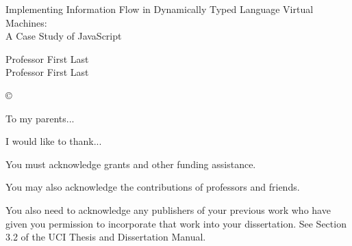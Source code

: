 \documentclass[12pt,fleqn]{ucithesis}
\begin{document}
\thesistitle
{
	Implementing Information Flow in Dynamically Typed Language Virtual Machines:\\
	A Case Study of JavaScript
}




\othercommitteemembers
{
	Professor First Last\\
	Professor First Last
}


\copyrightdeclaration
{
	{\copyright} {\Degreeyear} \Authorname
}


\dedications
{
	To my parents...
}

\acknowledgments
{
	I would like to thank...

	You must acknowledge grants and other funding assistance. 

	You may also acknowledge the contributions of professors and friends. 
	
	You also need to acknowledge any publishers of your previous work who have given you permission to incorporate that work into your dissertation. See Section 3.2 of the UCI Thesis and Dissertation Manual.
}
\end{document}
